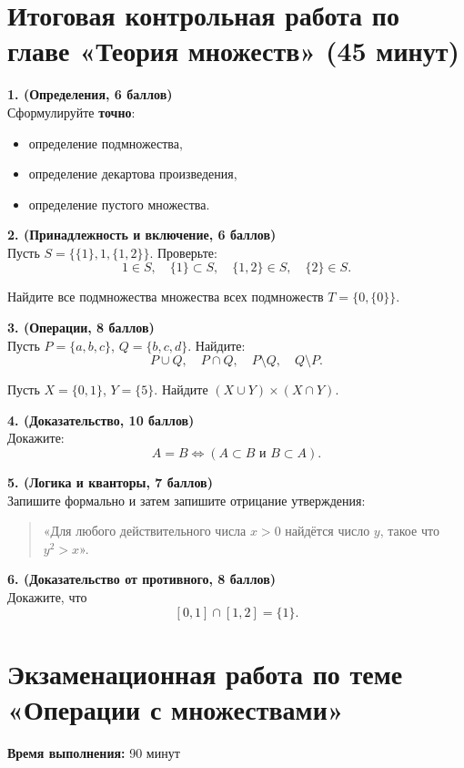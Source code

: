 \documentclass[12pt]{article}
\begin{document}
\section{Итоговая контрольная работа по главе «Теория множеств» (45 минут)}

\textbf{1. (Определения, 6 баллов)}\\
Сформулируйте \textbf{точно}:
\begin{itemize}
\item определение подмножества,
\item определение декартова произведения,
\item определение пустого множества.
\end{itemize}

\medskip
\textbf{2. (Принадлежность и включение, 6 баллов)}\\
Пусть $S=\{\{1\},1,\{1,2\}\}$.  
Проверьте:
\[
1\in S,\quad
\{1\}\subset S,\quad
\{1,2\}\in S,\quad
\{2\}\in S.
\]

Найдите все подмножества множества всех подмножеств $T=\{0,\{0\}\}$.

\medskip
\textbf{3. (Операции, 8 баллов)}\\
Пусть $P=\{a,b,c\}$, $Q=\{b,c,d\}$. Найдите:
\[
P\cup Q,\quad
P\cap Q,\quad
P\setminus Q,\quad
Q\setminus P.
\]

Пусть $X=\{0,1\}$, $Y=\{5\}$.  
Найдите $(X\cup Y)\times(X\cap Y)$.

\medskip
\textbf{4. (Доказательство, 10 баллов)}\\
Докажите:
\[
A=B \Longleftrightarrow (A\subset B \text{ и } B\subset A).
\]

\medskip
\textbf{5. (Логика и кванторы, 7 баллов)}\\
Запишите формально и затем запишите отрицание утверждения:
\begin{quote}
«Для любого действительного числа $x>0$ найдётся число $y$, такое что $y^2>x$».
\end{quote}

\medskip
\textbf{6. (Доказательство от противного, 8 баллов)}\\
Докажите, что
\[
[0,1]\cap[1,2]=\{1\}.
\]

\section*{Экзаменационная работа по теме «Операции с множествами»}

\textbf{Время выполнения:} 90 минут
\end{document}
